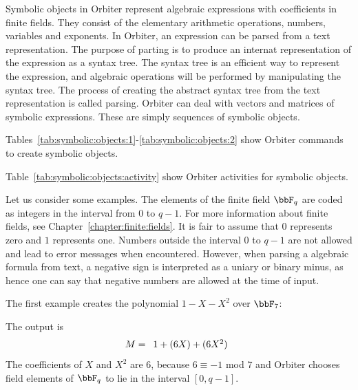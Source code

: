 Symbolic objects in Orbiter represent algebraic expressions with coefficients in finite fields.
They consist of the elementary arithmetic operations, 
numbers, variables and exponents.
In Orbiter, an expression can be parsed from a text representation. 
The purpose of parting is to produce an internat representation of the expression as a syntax tree. 
The syntax tree is an efficient way to represent the expression, 
and algebraic operations will be performed by manipulating the syntax tree.
The process of creating the abstract syntax tree 
from the text representation is called parsing. 
Orbiter can deal with vectors and matrices of symbolic expressions. 
These are simply sequences of symbolic objects.


\bigskip


Tables~\ref{tab:symbolic:objects:1}-\ref{tab:symbolic:objects:2} 
show Orbiter commands to create symbolic objects. 

\bigskip

Table~\ref{tab:symbolic:objects:activity} 
show Orbiter activities for symbolic objects. 

\bigskip


Let us consider some examples. 
The elements of the finite field $\bbF_q$ are coded as integers in the interval from $0$ to $q-1$.  
For more information about finite fields, 
see Chapter~\ref{chapter:finite:fields}.
It is fair to assume that $0$ represents zero and $1$ represents one.
Numbers outside the interval $0$ to $q-1$ are not allowed 
and lead to error messages when encountered.
However, when parsing a algebraic formula from text, 
a negative sign is interpreted as a uniary or binary minus, 
as hence one can say that negative numbers are allowed at the time of input.

\bigskip

The first example creates the polynomial $1-X-X^2$ over $\bbF_7$:


The output is 
$$
M = 
\begin{array}{*{1}c}
1 + (6 X) + (6 X^{2})\\
\end{array}
$$
The coefficients of $X$ and $X^2$ are $6$, because $6 \equiv -1$ mod $7$ 
and Orbiter chooses field elements of $\bbF_q$ to lie in the interval $[0,q-1].$



